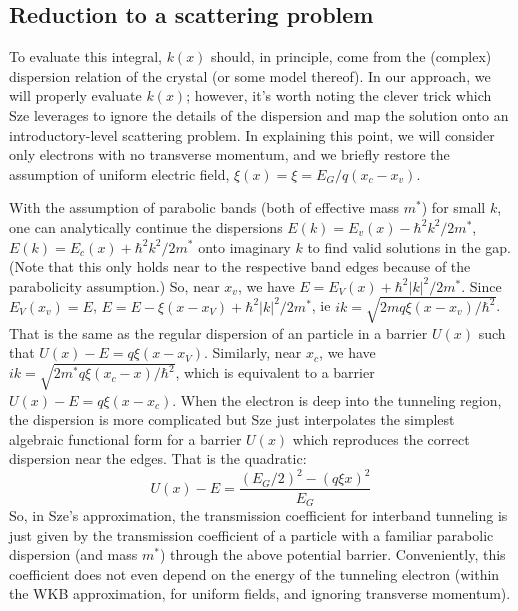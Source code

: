 \subsection{Reduction to a scattering problem}
To evaluate this integral, $k(x)$ should, in principle, come from the (complex) dispersion relation of the crystal (or some model thereof).  In our approach, we will properly evaluate $k(x)$; however, it's worth noting the clever trick which Sze leverages to ignore the details of the dispersion and map the solution onto an introductory-level scattering problem.  In explaining this point, we will consider only electrons with no transverse momentum, and we briefly restore the assumption of uniform electric field, $\xi(x)=\xi=E_G/q(x_c-x_v)$.

With the assumption of parabolic bands (both of effective mass $m^*$) for small $k$, one can  analytically continue the dispersions $E(k)=E_v(x)-\hbar^2k^2/2m^*$, $E(k)=E_c(x)+\hbar^2k^2/2m^*$ onto imaginary $k$ to find valid solutions in the gap.  (Note that this only holds near to the respective band edges because of the parabolicity assumption.)  So, near $x_v$, we have $E=E_V(x)+\hbar^2|k|^2/2m^*$.  Since $E_V(x_v)=E$, $E=E-\xi(x-x_V)+\hbar^2|k|^2/2m^*$, ie $ik=\sqrt{2mq\xi(x-x_v)/\hbar^2}$.  That is the same as the regular dispersion of an particle in a barrier $U(x)$ such that $U(x)-E=q\xi(x-x_V)$.  Similarly, near $x_c$, we have $ik=\sqrt{2m^*q\xi(x_c-x)/\hbar^2}$, which is equivalent to a barrier $U(x)-E=q\xi(x-x_c)$.  When the electron is deep into the tunneling region, the dispersion is more complicated but Sze just interpolates the simplest algebraic functional form for a barrier $U(x)$ which reproduces the correct dispersion near the edges.  That is the quadratic:
$$U(x)-E=\frac{(E_G/2)^2-(q\xi x)^2}{E_G}$$
So, in Sze's approximation, the transmission coefficient for interband tunneling is just given by the transmission coefficient of a particle with a familiar parabolic dispersion (and mass $m^*$) through the above potential barrier.  Conveniently, this coefficient does not even depend on the energy of the tunneling electron (within the WKB approximation, for uniform fields, and ignoring transverse momentum).